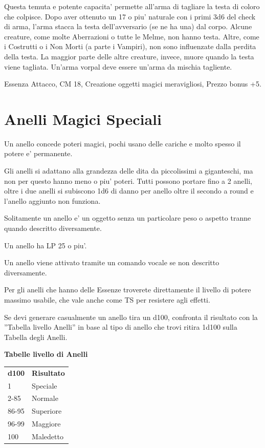 \documentclass[a4paper,11pt,twoside,openany]{book}
\begin{document}
{		Questa temuta e potente capacita' permette all'arma di tagliare la testa di coloro che colpisce. Dopo aver ottenuto un 17 o piu' naturale con i primi 3d6 del check di arma, l'arma stacca la testa dell'avversario (se ne ha una) dal corpo. Alcune creature, come molte Aberrazioni o tutte le Melme, non hanno testa. Altre, come i Costrutti o i Non Morti (a parte i Vampiri), non sono influenzate dalla perdita della testa. La maggior parte delle altre creature, invece, muore quando la testa viene tagliata. Un'arma vorpal deve essere un'arma da mischia tagliente.
		
		Essenza Attacco, CM 18, Creazione oggetti magici meravigliosi, Prezzo bonus +5.
		
		\pagebreak
		
		\section{Anelli Magici Speciali}
		
		\label{anelli-magici-speciali}
		
		Un anello concede poteri magici, pochi usano delle cariche e molto spesso il potere e' permanente.
		
		Gli anelli si adattano alla grandezza delle dita da piccolissimi a giganteschi, ma non per questo hanno meno o piu' poteri. Tutti possono portare fino a 2 anelli, oltre i due anelli si subiscono 1d6 di danno per anello oltre il secondo a round e l'anello aggiunto non funziona.
		
		Solitamente un anello e' un oggetto senza un particolare peso o aspetto tranne quando descritto diversamente.
		
		Un anello ha LP 25 o piu'.
		
		Un anello viene attivato tramite un comando vocale se non descritto diversamente.
		
		Per gli anelli che hanno delle Essenze troverete direttamente il livello di potere massimo usabile, che vale anche come TS per resistere agli effetti.
		
		Se devi generare casualmente un anello tira un d100, confronta il risultato con la ''Tabella livello Anelli'' in base al tipo di anello che trovi ritira 1d100 sulla Tabella degli Anelli.
		
		\bigskip
		
		\textbf{Tabelle livello di Anelli}
		
		\medskip
		\begin{tabular}{ll}
			\toprule
			\textbf{d100} & \textbf{Risultato}\tabularnewline
			1 & Speciale\tabularnewline
			2-85 & Normale\tabularnewline
			86-95 & Superiore\tabularnewline
			96-99 & Maggiore\tabularnewline
			100 & Maledetto\tabularnewline
			

\end{tabular}}
\end{document}
